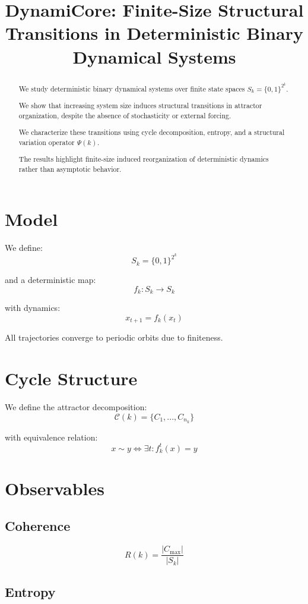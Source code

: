 \documentclass[11pt]{article}
\title{DynamiCore: Finite-Size Structural Transitions in Deterministic Binary Dynamical Systems}
\begin{document}
\maketitle

\begin{abstract}
We study deterministic binary dynamical systems over finite state spaces $S_k = \{0,1\}^{2^k}$.

We show that increasing system size induces structural transitions in attractor organization, despite the absence of stochasticity or external forcing.

We characterize these transitions using cycle decomposition, entropy, and a structural variation operator $\Psi(k)$.

The results highlight finite-size induced reorganization of deterministic dynamics rather than asymptotic behavior.
\end{abstract}

\section{Model}

We define:
\[
S_k = \{0,1\}^{2^k}
\]

and a deterministic map:
\[
f_k: S_k \rightarrow S_k
\]

with dynamics:
\[
x_{t+1} = f_k(x_t)
\]

All trajectories converge to periodic orbits due to finiteness.

\section{Cycle Structure}

We define the attractor decomposition:
\[
\mathcal{C}(k) = \{C_1, ..., C_{n_k}\}
\]

with equivalence relation:
\[
x \sim y \iff \exists t: f_k^t(x) = y
\]

\section{Observables}

\subsection{Coherence}

\[
R(k) = \frac{|C_{\max}|}{|S_k|}
\]

\subsection{Entropy}
\end{document}
